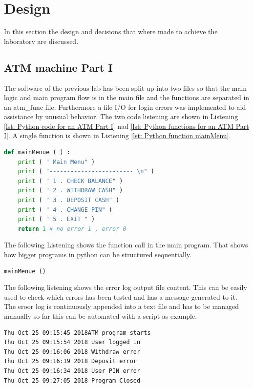\section{Design}\label{sec: Design}
In this section the design and decisions that where made to achieve the laboratory are discussed.

\subsection{ATM machine Part I}\label{subsec: ATM machine Part I}
The software of the previous lab has been split up into two files so that the main logic and main program flow is in the main file and the functions are separated in an atm\_func file. Furthermore a file I/O for login errors was implemented to aid assistance by unusual behavior. The two code listening are shown in Listening \ref{lst: Python code for an ATM Part I} nad \ref{lst: Python functions for an ATM Part I}. A single function is shown in Listening \ref{lst: Python function mainMenu}.

\begin{lstlisting}[style=PythonStyle, language=Python, caption={Python function mainMenu .},label=lst: Python function mainMenu ]
def mainMenue ( ) :
	print ( " Main Menu" )
	print ( "------------------------ \n" )
	print ( " 1 . CHECK BALANCE" )
	print ( " 2 . WITHDRAW CASH" )
	print ( " 3 . DEPOSIT CASH" )
	print ( " 4 . CHANGE PIN" )
	print ( " 5 . EXIT " )
	return 1 # no error 1 , error 0
\end{lstlisting}

The following Listening shows the function call in the main program. That shows how bigger programs in python can be structured sequentially.

\begin{lstlisting}[style=PythonStyle, language=Python, caption={Python function call mainMenu .},label=lst: Python function call mainMenu ]
mainMenue () 
\end{lstlisting}
The following listening shows the error log output file content. This can be easily used to check which errors has been tested and has a message generated to it. The eroor log is continuously appended into a text file and has to be managed manually so far this can be automated with a script as example.
\begin{verbatim}
Thu Oct 25 09:15:45 2018ATM program starts 
Thu Oct 25 09:15:54 2018 User logged in 
Thu Oct 25 09:16:06 2018 Withdraw error
Thu Oct 25 09:16:19 2018 Deposit error
Thu Oct 25 09:16:34 2018 User PIN error
Thu Oct 25 09:27:05 2018 Program Closed
\end{verbatim}

